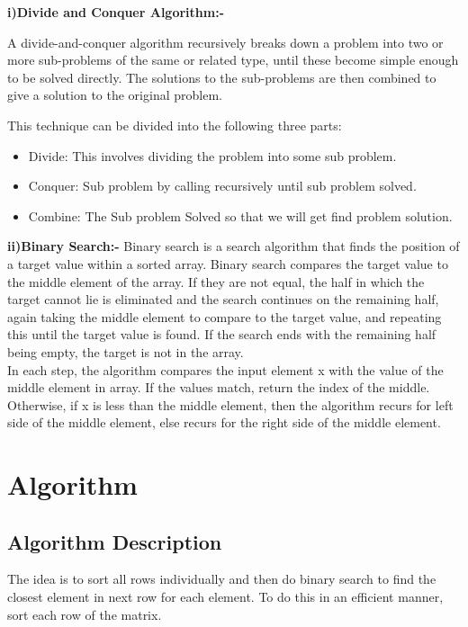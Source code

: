 \documentclass[conference]{IEEEtran}
\begin{document}
\textbf{i)Divide and Conquer Algorithm:-} 

 A divide-and-conquer algorithm recursively breaks down a problem into two or more sub-problems of the same or related type, until these become simple enough to be solved directly. The solutions to the sub-problems are then combined to give a solution to the original problem. 
 
 
This technique can be divided into the following three parts:
\begin{itemize}
\item Divide: This involves dividing the problem into some sub           problem.

\item Conquer: Sub problem by calling recursively until sub problem solved.

\item Combine: The Sub problem Solved so that we will get find problem solution. 
\end{itemize}


\textbf{ii)Binary Search:- }
          Binary search is a search algorithm that finds the position of a target value within a sorted array. Binary search compares the target value to the middle element of the array. If they are not equal, the half in which the target cannot lie is eliminated and the search continues on the remaining half, again taking the middle element to compare to the target value, and repeating this until the target value is found. If the search ends with the remaining half being empty, the target is not in the array.\\
 In each step, the algorithm compares the input element x with the value of the middle element in array. If the values match, return the index of the middle. Otherwise, if x is less than the middle element, then the algorithm recurs for left side of the middle element, else recurs for the right side of the middle element.



\section{Algorithm}

\subsection{Algorithm Description}

The idea is to sort all rows individually and then do binary search to find the closest element in next row for each element. To do this in an efficient manner, sort each row of the matrix.
\\
\end{document}
